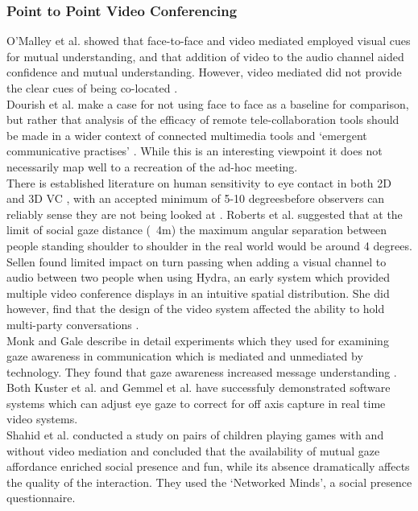             \subsubsection{Point to Point Video Conferencing}
                O'Malley et al. showed that face-to-face and video mediated employed  visual cues for mutual understanding, and that addition of video to the audio channel aided confidence and mutual understanding. However, video mediated did not provide the clear cues of being co-located \cite{O'Malley1996}.\\
                Dourish et al. make a case for not using face to face as a baseline for comparison, but rather that analysis of the efficacy of remote tele-collaboration tools should be made in a wider context of connected multimedia tools and `emergent communicative practises' \cite{Dourish1993}. While this is an interesting viewpoint it does not necessarily map well to a recreation of the ad-hoc meeting.\\
There is established literature on human sensitivity to eye contact in both 2D and 3D VC \cite{Criminisi2003, Eijk2010}, with an accepted minimum of 5-10 degreesbefore observers can reliably sense they are not being looked at \cite{Chen2002}. Roberts et al. suggested that at the limit of social gaze distance (~4m) the maximum angular separation between people standing shoulder to shoulder in the real world would be around 4 degrees\cite{Roberts2013}. \\
                Sellen found limited impact on turn passing when adding a visual channel to audio between two people when using Hydra, an early system which provided multiple video conference displays in an intuitive spatial distribution\cite{Sellen1992a}. She did however, find that the design of the video system affected the ability to hold multi-party conversations \cite{Sellen1995a}.\\
                Monk and Gale describe in detail experiments which they used 
 for examining gaze awareness in communication which is mediated and unmediated by technology.  
  They   found that gaze awareness increased message understanding  
  \cite{Monk2002}.\\
                Both Kuster et al. and Gemmel et al. have successfuly demonstrated software systems which can adjust eye gaze to correct for off axis capture in real time video systems\cite{Gemmell2000, Kuster2012b}.\\
                Shahid et al. conducted a study on pairs of children playing games with and without video mediation and concluded that the availability of mutual gaze affordance enriched social presence and fun, while its absence dramatically affects the quality of the interaction. They used the `Networked Minds', a social presence questionnaire.                
